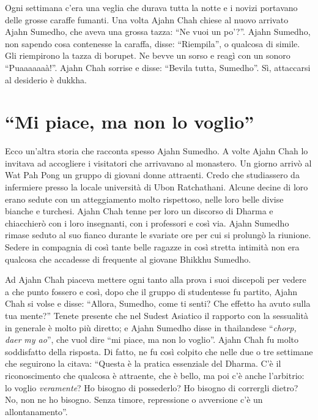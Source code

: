 Ogni settimana c'era una veglia che durava tutta la notte e i novizi portavano delle grosse caraffe fumanti. Una volta Ajahn Chah chiese al nuovo arrivato Ajahn Sumedho, che aveva una grossa tazza: ``Ne vuoi un po'?''. Ajahn Sumedho, non sapendo cosa contenesse la caraffa, disse: ``Riempila'', o qualcosa di simile. Gli riempirono la tazza di borupet. Ne bevve un sorso e reagì con un sonoro ``Puaaaaaaà!''. Ajahn Chah sorrise e disse: ``Bevila tutta, Sumedho''. Sì, attaccarsi al desiderio è dukkha.

\section*{``Mi piace, ma non lo voglio''}

Ecco un'altra storia che racconta spesso Ajahn Sumedho. A volte Ajahn Chah lo invitava ad accogliere i visitatori che arrivavano al monastero. Un giorno arrivò al Wat Pah Pong un gruppo di giovani donne attraenti. Credo che studiassero da infermiere presso la locale università di Ubon Ratchathani. Alcune decine di loro erano sedute con un atteggiamento molto rispettoso, nelle loro belle divise bianche e turchesi. Ajahn Chah tenne per loro un discorso di Dharma e chiacchierò con i loro insegnanti, con i professori e così via. Ajahn Sumedho rimase seduto al suo fianco durante le svariate ore per cui si prolungò la riunione. Sedere in compagnia di così tante belle ragazze in così stretta intimità non era qualcosa che accadesse di frequente al giovane Bhikkhu Sumedho.

Ad Ajahn Chah piaceva mettere ogni tanto alla prova i suoi discepoli per vedere a che punto fossero e così, dopo che il gruppo di studentesse fu partito, Ajahn Chah si volse e disse: ``Allora, Sumedho, come ti senti? Che effetto ha avuto sulla tua mente?'' Tenete presente che nel Sudest Asiatico il rapporto con la sessualità in generale è molto più diretto; e Ajahn Sumedho disse in thailandese ``\textit{chorp, daer }\textit{my ao}'', che vuol dire ``mi piace, ma non lo voglio''. Ajahn Chah fu molto soddisfatto della risposta. Di fatto, ne fu così colpito che nelle due o tre settimane che seguirono la citava: ``Questa è la pratica essenziale del Dharma. C'è il riconoscimento che qualcosa è attraente, che è bello, ma poi c'è anche l'arbitrio: lo voglio \textit{veramente}? Ho bisogno di possederlo? Ho bisogno di corrergli dietro? No, non ne ho bisogno. Senza timore, repressione o avversione c'è un allontanamento''.

